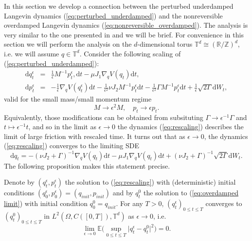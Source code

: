 In this section we develop a connection between the perturbed underdamped
Langevin dynamics (\ref{eq:perturbed_underdamped}) and
the nonreversible overdamped Langevin dynamics (\ref{eq:nonreversible_overdamped}). The analysis is very similar to the one presented in \cite[Section 2.2.2]{Free_energy_computations} and we will be brief. For convenience in this section we will perform the analysis on the $d$-dimensional torus $\mathbb{T}^d \cong (\mathbb{R} / \mathbb{Z})^d$, i.e. we will assume $q \in \mathbb{T}^d$.
Consider the following scaling of (\ref{eq:perturbed_underdamped}):
\begin{subequations}
\begin{eqnarray}
\mathrm{d}q_{t}^{\epsilon} & = &  \frac{1}{\epsilon}M^{-1}p_{t}^{\epsilon},\mathrm{d}t-\mu J_{1}\nabla_{q}V(q_{t})\mathrm{d}t, \\
\mathrm{d}p_{t}^{\epsilon} & = & -\frac{1}{\epsilon}\nabla_{q}V(q_{t}^{\epsilon})\mathrm{d}t-\frac{1}{\epsilon^{2}}\nu J_{2}M^{-1}p_{t}^{\epsilon}\mathrm{d}t-\frac{1}{\epsilon^{2}}\Gamma M^{-1}p_{t}^{\epsilon}\mathrm{d}t+\frac{1}{\epsilon}\sqrt{2\Gamma}\mathrm{d}W_{t},
\end{eqnarray}
\label{eq:rescaling}
\end{subequations}
valid for the small mass/small momentum regime 
\begin{equation*}
M  \rightarrow\epsilon^{2}M, \quad   p_{t}  \rightarrow\epsilon p_{t}.
\end{equation*}
Equivalently, those modifications can be obtained from subsituting
$\Gamma\rightarrow\epsilon^{-1}\Gamma$ and $t\mapsto\epsilon^{-1}t$,
and so in the limit as $\epsilon\rightarrow0$ the dynamics (\ref{eq:rescaling})
describes the limit of large friction with rescaled time. It turns
out that as $\epsilon\rightarrow0$, the dynamics (\ref{eq:rescaling})
converges to the limiting SDE 
\begin{equation}
\mathrm{d}q_{t}=-(\nu J_{2}+\Gamma)^{-1}\nabla_{q}V(q_{t})\mathrm{d}t-\mu J_{1}\nabla_{q}V(q_{t})\mathrm{d}t+(\nu J_{2}+\Gamma)^{-1}\sqrt{2\Gamma}\mathrm{d}W_{t}.\label{eq:overdamped limit}
\end{equation}
The following proposition makes this statement precise.
\begin{proposition}
	\label{prop: overdamped limit}Denote by $(q_{t}^{\epsilon},p_{t}^{\epsilon})$
	the solution to (\ref{eq:rescaling}) with (deterministic) initial
	conditions $(q_{0}^{\epsilon},p_{0}^{\epsilon})=(q_{init},p_{init})$
	and by $q_{t}^{0}$ the solution to (\ref{eq:overdamped limit}) with
	initial condition $q_{0}^{0}=q_{init}.$ For any $T>0$, $(q_{t}^{\epsilon})_{0\le t\le T}$
	converges to $(q_{t}^{0})_{0\le t\le T}$ in $L^{2}(\Omega,C([0,T]),\mathbb{T}^{d})$
	as $\epsilon\rightarrow0$, i.e. 
	\[
	\lim_{\epsilon\rightarrow0}\mathbb{E}\big(\sup_{0\le t\le T}\vert q_{t}^{\epsilon}-q_{t}^{0}\vert^{2}\big)=0.
	\]
\end{proposition}
